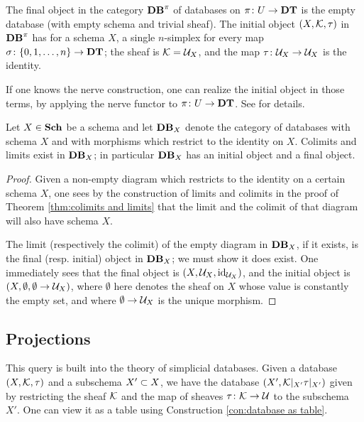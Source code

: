 \documentclass{amsart}
\begin{document}
\begin{remark}

The final object in the category $\Data^\pi$ of databases on $\pi\taking U\to\DT$ is the empty database (with empty schema and trivial sheaf).  The initial object $(X,\mcK,\tau)$ in $\Data^\pi$ has for a schema $X$, a single $n$-simplex for every map $\sigma\taking\{0,1,\ldots,n\}\to\DT$; the sheaf is $\mcK=\mcU_X$, and the map $\tau\taking\mcU_X\to\mcU_X$ is the identity.

If one knows the \Cech nerve construction, one can realize the initial object in those terms, by applying the \Cech nerve functor to $\pi\taking U\to\DT$.  See \cite[3.1]{Spi} for details.

\end{remark}

\begin{corollary}\label{cor:colimits and limits}

Let $X\in\Sch$ be a schema and let $\Data_X$ denote the category of databases with schema $X$ and with morphisms which restrict to the identity on $X$.  Colimits and limits exist in $\Data_X$; in particular $\Data_X$ has an initial object and a final object.

\end{corollary}

\begin{proof}

Given a non-empty diagram which restricts to the identity on a certain schema $X$, one sees by the construction of limits and colimits in the proof of Theorem \ref{thm:colimits and limits} that the limit and the colimit of that diagram will also have schema $X$.  

The limit (respectively the colimit) of the empty diagram in $\Data_X$, if it exists, is the final (resp. initial) object in $\Data_X$; we must show it does exist.  One immediately sees that the final object is $(X,\mcU_X,\id_{\mcU_X})$, and the initial object is $(X,\emptyset,\emptyset\to\mcU_X)$, where $\emptyset$ here denotes the sheaf on $X$ whose value is constantly the empty set, and where $\emptyset\to\mcU_X$ is the unique morphism.


\end{proof}

\subsection{Projections}\label{subsec:projections}

This query is built into the theory of simplicial databases.  Given a database $(X,\mcK,\tau)$ and a subschema $X'\ss X$, we have the database $(X',\mcK|_{X'}\tau|_{X'})$ given by restricting the sheaf $\mcK$ and the map of sheaves $\tau\taking\mcK\to\mcU$ to the subschema $X'$.  One can view it as a table using Construction \ref{con:database as table}.
\end{document}
